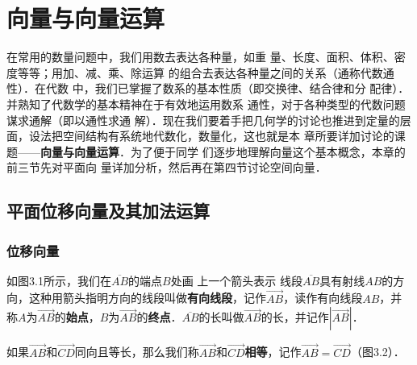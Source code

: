 \chapter{向量与向量运算}
在常用的数量问题中，我们用数去表达各种量，如重
量、长度、面积、体积、密度等等；用加、减、乘、除运算
的组合去表达各种量之间的关系（通称代数通性）．在代数
中，我们已掌握了数系的基本性质（即交换律、结合律和分
配律）．并熟知了代数学的基本精神在于有效地运用数系
通性，对于各种类型的代数问题谋求通解（即以通性求通
解）．现在我们要着手把几何学的讨论也推进到定量的层
面，设法把空间结构有系统地代数化，数量化，这也就是本
章所要详加讨论的课题——\textbf{向量与向量运算}．为了便于同学
们逐步地理解向量这个基本概念，本章的前三节先对平面向
量详加分析，然后再在第四节讨论空间向量．

\section{平面位移向量及其加法运算}

\subsection{位移向量}

如图3.1所示，我们在$\overline{AB}$的端点$B$处画
上一个箭头表示 线段$\overline{AB}$具有射线$AB$的方向，这种用箭头指明方向的线段叫做\textbf{有向线段}，记作$\Vec{AB}$，读作有向线段$AB$，并称$A$为$\Vec{AB}$的\textbf{始点}，$B$为$\Vec{AB}$的\textbf{终点}．$\overline{AB}$的长叫做$\Vec{AB}$的长，并记作$|\Vec{AB}|$．

如果$\Vec{AB}$和$\Vec{CD}$同向且等长，那么我们称$\Vec{AB}$和$\Vec{CD}$\textbf{相等}，记作$\Vec{AB}=\Vec{CD}$（图3.2）．

\begin{figure}[htp]\centering
    \begin{minipage}[t]{0.48\textwidth}
    \centering
{}
    \caption{}
    \end{minipage}
    \begin{minipage}[t]{0.48\textwidth}
    \centering
    \caption{}
    \end{minipage}
    \end{figure}


